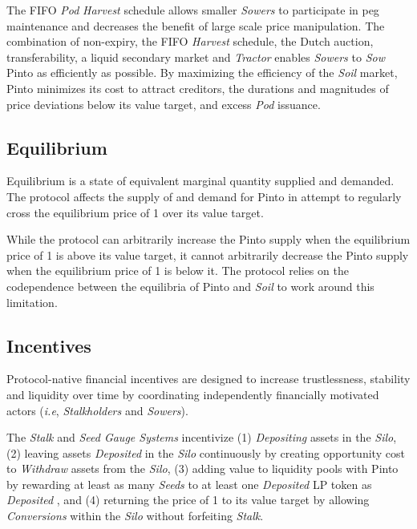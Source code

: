 \documentclass[tikz]{article}
\newcommand{\term}[1]{\textsl{#1}}
\newcommand{\Pinto}{} %
\begin{document}
The FIFO \term{Pod} \term{Harvest} schedule allows smaller \term{Sowers} to participate in peg maintenance and decreases the benefit of large scale price manipulation. The combination of non-expiry, the FIFO \term{Harvest} schedule, the Dutch auction, transferability, a liquid secondary market and \term{Tractor} enables \term{Sowers} to \term{Sow} Pinto as efficiently as possible. By maximizing the efficiency of the \term{Soil} market, Pinto minimizes its cost to attract creditors, the durations and magnitudes of price deviations below its value target, and excess \term{Pod} issuance.


\subsection{Equilibrium}
\vspace{-0.15cm}

Equilibrium is a state of equivalent marginal quantity supplied and demanded. The protocol affects the supply of and demand for Pinto in attempt to regularly cross the equilibrium price of \Pinto1 over its value target. 

\vspace{-0.15cm}

While the protocol can arbitrarily increase the Pinto supply when the equilibrium price of \Pinto1 is above its value target, it cannot arbitrarily decrease the Pinto supply when the equilibrium price of \Pinto1 is below it. The protocol relies on the codependence between the equilibria of Pinto and \term{Soil} to work around this limitation. 


\vspace{-0.15cm}
\subsection{Incentives}
\vspace{-0.15cm}

Protocol-native financial incentives are designed to increase trustlessness, stability and liquidity over time by coordinating independently financially motivated actors (\textit{i.e}, \term{Stalkholders} and \term{Sowers}). 

\vspace{-0.15cm}

The \term{Stalk} and \term{Seed Gauge Systems} incentivize (1) \term{Depositing} assets in the \term{Silo}, (2) leaving assets \term{Deposited} in the \term{Silo} continuously by creating opportunity cost to \term{Withdraw} assets from the \term{Silo}, (3) adding value to liquidity pools with Pinto by rewarding at least as many \term{Seeds} to at least one \term{Deposited} LP token as \term{Deposited} \Pinto, and (4) returning the price of \Pinto1 to its value target by allowing \term{Conversions} within the \term{Silo} without forfeiting \term{Stalk}.
\end{document}

